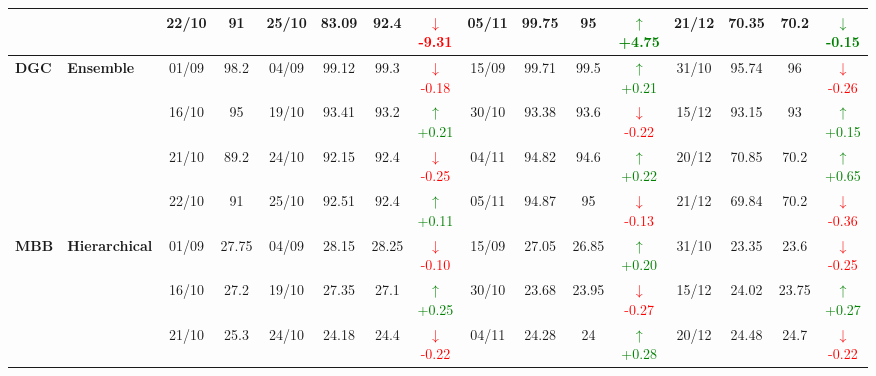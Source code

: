\documentclass{ieeeaccess}
\begin{document}
{\begin{longtable}{llcc|cccc|cccc|cccc}
&
& 22/10 & 91 & 25/10 & 83.09 & 92.4 & \textcolor{red}{\(\downarrow\)-9.31} & 05/11 & 99.75 & 95 & \textcolor{green}{\(\uparrow\)+4.75} & 21/12 & 70.35 & 70.2 & \textcolor{green}{\(\downarrow\)-0.15} \\
\midrule


\multirow{4}{*}{\textbf{DGC}} 
& \textbf{Ensemble}
& 01/09 & 98.2 & 04/09 & 99.12 & 99.3 & \textcolor{red}{\(\downarrow\)-0.18} & 15/09 & 99.71 & 99.5 & \textcolor{green}{\(\uparrow\)+0.21} & 31/10 & 95.74 & 96 & \textcolor{red}{\(\downarrow\)-0.26} \\

&
& 16/10 & 95 & 19/10 & 93.41 & 93.2 & \textcolor{green}{\(\uparrow\)+0.21} & 30/10 & 93.38 & 93.6 & \textcolor{red}{\(\downarrow\)-0.22} & 15/12 & 93.15 & 93 & \textcolor{green}{\(\uparrow\)+0.15} \\

&
& 21/10 & 89.2 & 24/10 & 92.15 & 92.4 & \textcolor{red}{\(\downarrow\)-0.25} & 04/11 & 94.82 & 94.6 & \textcolor{green}{\(\uparrow\)+0.22} & 20/12 & 70.85 & 70.2 & \textcolor{green}{\(\uparrow\)+0.65} \\

&
& 22/10 & 91 & 25/10 & 92.51 & 92.4 & \textcolor{green}{\(\uparrow\)+0.11} & 05/11 & 94.87 & 95 & \textcolor{red}{\(\downarrow\)-0.13} & 21/12 & 69.84 & 70.2 & \textcolor{red}{\(\downarrow\)-0.36} \\
\midrule



\multirow{4}{*}{\textbf{MBB}} 
& \textbf{Hierarchical}
& 01/09 & 27.75 & 04/09 & 28.15 & 28.25 & \textcolor{red}{\(\downarrow\)-0.10} & 15/09 & 27.05 & 26.85 & \textcolor{green}{\(\uparrow\)+0.20} & 31/10 & 23.35 & 23.6 & \textcolor{red}{\(\downarrow\)-0.25} \\

&
& 16/10 & 27.2 & 19/10 & 27.35 & 27.1 & \textcolor{green}{\(\uparrow\)+0.25} & 30/10 & 23.68 & 23.95 & \textcolor{red}{\(\downarrow\)-0.27} & 15/12 & 24.02 & 23.75 & \textcolor{green}{\(\uparrow\)+0.27} \\

&
& 21/10 & 25.3 & 24/10 & 24.18 & 24.4 & \textcolor{red}{\(\downarrow\)-0.22} & 04/11 & 24.28 & 24 & \textcolor{green}{\(\uparrow\)+0.28} & 20/12 & 24.48 & 24.7 & \textcolor{red}{\(\downarrow\)-0.22} \\


\end{longtable}}
\end{document}
